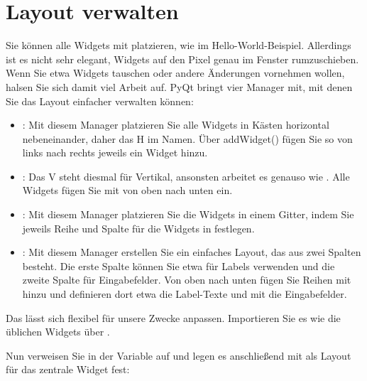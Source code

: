 \medskip


\section{Layout verwalten}

Sie können alle Widgets mit  platzieren, wie im Hello-World-Beispiel. Allerdings ist es nicht sehr elegant, Widgets auf den Pixel genau im Fenster rumzuschieben. Wenn Sie etwa Widgets tauschen oder andere Änderungen vornehmen wollen, halsen Sie sich damit viel Arbeit auf. PyQt bringt vier Manager mit, mit denen Sie das Layout einfacher verwalten können:
 
\begin{itemize}
  \item {}: Mit diesem Manager platzieren Sie alle Widgets in Kästen horizontal nebeneinander, daher das H im Namen. Über addWidget() fügen Sie so von links nach rechts jeweils ein Widget hinzu.
  \item {}: Das V steht diesmal für Vertikal, ansonsten arbeitet es genauso wie . Alle Widgets fügen Sie mit  von oben nach unten ein.
  \item {}: Mit diesem Manager platzieren Sie die Widgets in einem Gitter, indem Sie jeweils Reihe und Spalte für die Widgets in  festlegen.
  \item {}: Mit diesem Manager erstellen Sie ein einfaches Layout, das aus zwei Spalten besteht. Die erste Spalte können Sie etwa für Labels verwenden und die zweite Spalte für Eingabefelder. Von oben nach unten fügen Sie Reihen mit  hinzu und definieren dort etwa die Label-Texte und mit  die Eingabefelder.
\end{itemize}    

Das  lässt sich flexibel für unsere Zwecke anpassen. Importieren Sie es wie die üblichen Widgets über .
    
Nun verweisen Sie in der Variable  auf  und legen es anschließend mit  als Layout für das zentrale Widget fest:

\medskip


